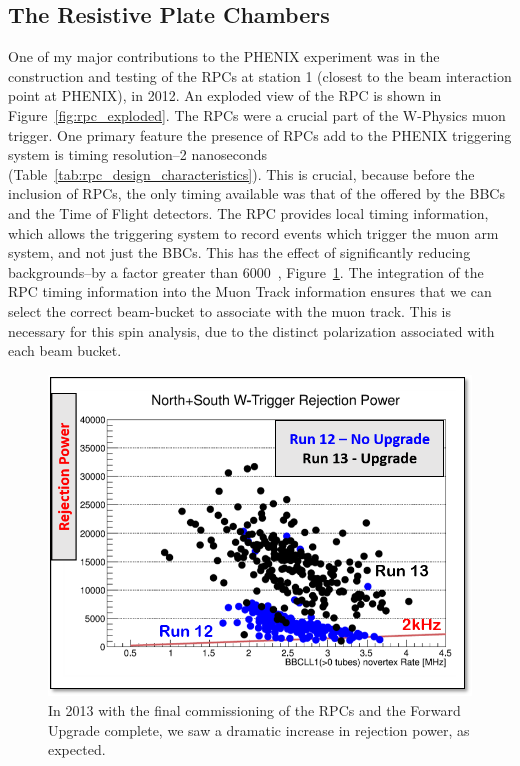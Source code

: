\clearpage
\subsection{The Resistive Plate Chambers}

One of my major contributions to the PHENIX experiment was in the construction
and testing of the RPCs at station 1 (closest to the beam interaction point at
PHENIX), in 2012. An exploded view of the RPC is shown in
Figure~\ref{fig:rpc_exploded}. The RPCs were a crucial part of the W-Physics
muon trigger. One primary feature the presence of RPCs add to the PHENIX
triggering system is timing resolution--2 nanoseconds
(Table~\ref{tab:rpc_design_characteristics}). This is crucial, because before
the inclusion of RPCs, the only timing available was that of the offered by the
BBCs and the Time of Flight detectors. The RPC provides local timing
information, which allows the triggering system to record events which trigger
the muon arm system, and not just the BBCs. This has the effect of significantly
reducing backgrounds--by a factor greater than 6000~\cite{Fukao2011},
Figure~\ref{fig:rpc_rejection_power}. The integration of the RPC timing
information into the  Muon Track information ensures that we can select the
correct beam-bucket to associate with the muon track. This is necessary for this
spin analysis, due to the distinct polarization associated with each beam
bucket.

\begin{figure}
  \centering
  \includegraphics[width=0.8\linewidth]{./figures/rejection_power.png}
  \caption{
    In 2013 with the final commissioning of the RPCs and the Forward Upgrade
    complete, we saw a dramatic increase in rejection power, as expected.
  }
  \label{fig:rpc_rejection_power}

\end{figure}


